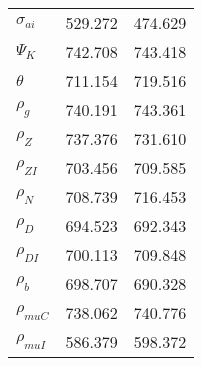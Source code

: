 \begin{center}
\begin{longtable}{lcc}
$ {\sigma_{ai}}        $	 & 	     529.272	 & 	     474.629 \\ 
$ {\Psi_{K}}           $	 & 	     742.708	 & 	     743.418 \\ 
$ {\theta}             $	 & 	     711.154	 & 	     719.516 \\ 
$ {\rho_g}             $	 & 	     740.191	 & 	     743.361 \\ 
$ {\rho_Z}             $	 & 	     737.376	 & 	     731.610 \\ 
$ {\rho_{ZI}}          $	 & 	     703.456	 & 	     709.585 \\ 
$ {\rho_N}             $	 & 	     708.739	 & 	     716.453 \\ 
$ {\rho_D}             $	 & 	     694.523	 & 	     692.343 \\ 
$ {\rho_{DI}}          $	 & 	     700.113	 & 	     709.848 \\ 
$ {\rho_b}             $	 & 	     698.707	 & 	     690.328 \\ 
$ {\rho_{muC}}         $	 & 	     738.062	 & 	     740.776 \\ 
$ {\rho_{muI}}         $	 & 	     586.379	 & 	     598.372 \\ 
\end{longtable}
 \end{center}
